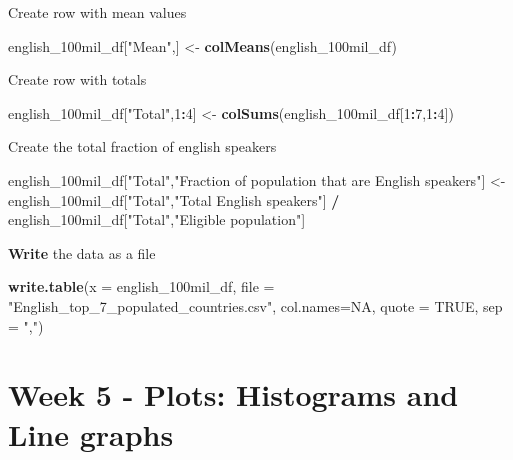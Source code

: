 \documentclass[]{book}
\newenvironment{Shaded}{\begin{snugshade}}{\end{snugshade}}
\newcommand{\KeywordTok}[1]{\textcolor[rgb]{0.13,0.29,0.53}{\textbf{#1}}}
\newcommand{\DataTypeTok}[1]{\textcolor[rgb]{0.13,0.29,0.53}{#1}}
\newcommand{\DecValTok}[1]{\textcolor[rgb]{0.00,0.00,0.81}{#1}}
\newcommand{\StringTok}[1]{\textcolor[rgb]{0.31,0.60,0.02}{#1}}
\newcommand{\OtherTok}[1]{\textcolor[rgb]{0.56,0.35,0.01}{#1}}
\newcommand{\OperatorTok}[1]{\textcolor[rgb]{0.81,0.36,0.00}{\textbf{#1}}}
\newcommand{\NormalTok}[1]{#1}
\begin{document}
Create row with mean values

\begin{Shaded}
\begin{Highlighting}[]
\NormalTok{english_100mil_df[}\StringTok{"Mean"}\NormalTok{,] <-}\StringTok{ }\KeywordTok{colMeans}\NormalTok{(english_100mil_df)}
\end{Highlighting}
\end{Shaded}

Create row with totals

\begin{Shaded}
\begin{Highlighting}[]
\NormalTok{english_100mil_df[}\StringTok{"Total"}\NormalTok{,}\DecValTok{1}\OperatorTok{:}\DecValTok{4}\NormalTok{] <-}\StringTok{ }\KeywordTok{colSums}\NormalTok{(english_100mil_df[}\DecValTok{1}\OperatorTok{:}\DecValTok{7}\NormalTok{,}\DecValTok{1}\OperatorTok{:}\DecValTok{4}\NormalTok{])}
\end{Highlighting}
\end{Shaded}

Create the total fraction of english speakers

\begin{Shaded}
\begin{Highlighting}[]
\NormalTok{english_100mil_df[}\StringTok{"Total"}\NormalTok{,}\StringTok{"Fraction of population that are English speakers"}\NormalTok{] <-}\StringTok{ }
\StringTok{  }\NormalTok{english_100mil_df[}\StringTok{"Total"}\NormalTok{,}\StringTok{"Total English speakers"}\NormalTok{] }\OperatorTok{/}
\StringTok{  }\NormalTok{english_100mil_df[}\StringTok{"Total"}\NormalTok{,}\StringTok{"Eligible population"}\NormalTok{]}
\end{Highlighting}
\end{Shaded}

\textbf{Write} the data as a file

\begin{Shaded}
\begin{Highlighting}[]
\KeywordTok{write.table}\NormalTok{(}\DataTypeTok{x =}\NormalTok{ english_100mil_df, }
            \DataTypeTok{file =} \StringTok{"English_top_7_populated_countries.csv"}\NormalTok{, }
            \DataTypeTok{col.names=}\OtherTok{NA}\NormalTok{,}
            \DataTypeTok{quote =} \OtherTok{TRUE}\NormalTok{, }
            \DataTypeTok{sep =} \StringTok{","}\NormalTok{)}
\end{Highlighting}
\end{Shaded}

\chapter{Week 5 - Plots: Histograms and Line
graphs}\label{week-5---plots-histograms-and-line-graphs}
\end{document}
